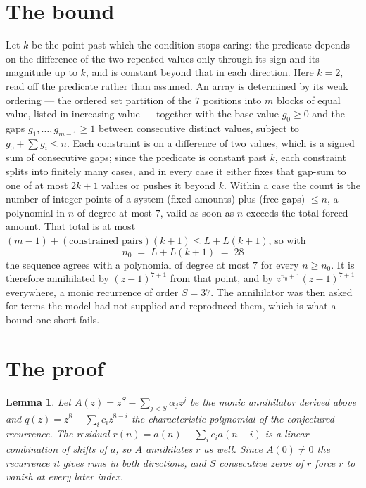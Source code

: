 \documentclass[11pt,a4paper]{article}
\theoremstyle{plain}
\newtheorem{lemma}[theorem]{Lemma}
\theoremstyle{definition}
\begin{document}
\section{The bound}

Let $k$ be the point past which the condition stops caring: the predicate depends on the
difference of the two repeated values only through its sign and its magnitude up to $k$, and is
constant beyond that in each direction. Here $k=2$, read off the predicate rather than
assumed. An array is determined by its weak ordering --- the ordered set partition of the
$7$ positions into $m$ blocks of equal value, listed in increasing value --- together with
the base value $g_0\ge0$ and the gaps $g_1,\dots,g_{m-1}\ge1$ between consecutive distinct
values, subject to $g_0+\sum g_i\le n$. Each constraint is on a difference of two values, which
is a signed sum of consecutive gaps; since the predicate is constant past $k$, each constraint
splits into finitely many cases, and in every case it either fixes that gap-sum to one of at
most $2k+1$ values or pushes it beyond $k$. Within a case the count is the number of integer
points of a system (fixed amounts) plus (free gaps) $\le n$, a polynomial in $n$ of degree at
most $7$, valid as soon as $n$ exceeds the total forced amount. That total is at most
$(m-1)+(\text{constrained pairs})(k+1)\le L+L(k+1)$, so with
\[
n_0 \;=\; L + L(k+1) \;=\; 28
\]
the sequence agrees with a polynomial of degree at most $7$ for every $n\ge n_0$. It is
therefore annihilated by $(z-1)^{7+1}$ from that point, and by $z^{n_0+1}(z-1)^{7+1}$
everywhere, a monic recurrence of order $S=37$. The annihilator was then asked for terms the
model had not supplied and reproduced them, which is what a bound one short fails.

\section{The proof}

\begin{lemma}\label{lem:crit}
Let $A(z)=z^S-\sum_{j<S}\alpha_jz^{j}$ be the monic annihilator derived above and
$q(z)=z^{8}-\sum_ic_iz^{8-i}$ the characteristic polynomial of the conjectured
recurrence. The residual $r(n)=a(n)-\sum_ic_ia(n-i)$ is a linear combination of shifts of $a$,
so $A$ annihilates $r$ as well. Since $A(0)\ne0$ the recurrence it gives runs in both
directions, and $S$ consecutive zeros of $r$ force $r$ to vanish at every later index.
\end{lemma}
\end{document}
